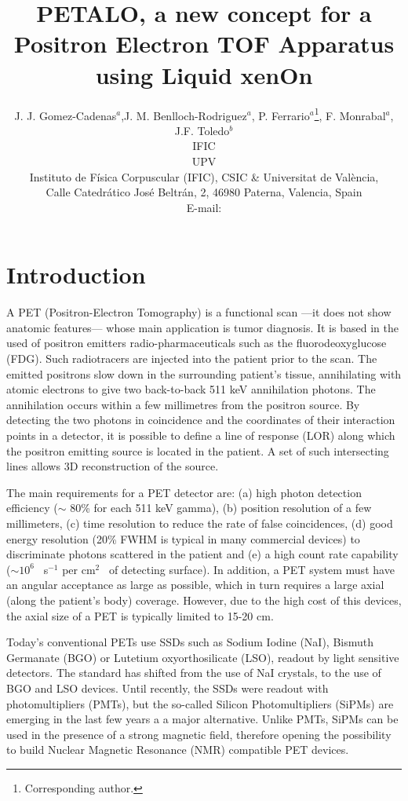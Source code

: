 \documentclass{JINST}
\title{PETALO, a new concept for a Positron Electron TOF Apparatus using Liquid xenOn}
\author{J. J. Gomez-Cadenas$^a$,J. M. Benlloch-Rodriguez$^a$, P. Ferrario$^a$\thanks{Corresponding author.}, 
F. Monrabal$^a$, J.F. Toledo$^b$

\llap{$^a$}IFIC\\
\llap{$^b$}UPV\\
\llap{$^b$}Instituto de F\'isica Corpuscular (IFIC), CSIC \& Universitat de Val\`encia,\\ 
Calle Catedr\'atico Jos\'e Beltr\'an, 2, 46980 Paterna, Valencia, Spain\\

E-mail: \email{gomez@mail.cern.ch}}
\begin{document}
\section{Introduction}

\label{sec.intro}

A PET (Positron-Electron Tomography) is a functional scan ---it does not show anatomic features--- whose main application is tumor diagnosis. It is based in the used of positron emitters radio-pharmaceuticals such as the fluorodeoxyglucose (FDG). Such radiotracers 
are injected into the patient prior to the scan. The emitted positrons slow down in the surrounding patient’s tissue, annihilating with atomic electrons to give two back-to-back 511 keV annihilation photons. The annihilation occurs within a few millimetres from the positron source. By detecting the two photons in coincidence and the coordinates of their interaction points in a detector, it is possible to define a line of response (LOR) along which the positron emitting source is located in the patient. A set of such intersecting lines allows 3D reconstruction of the source. 

The main requirements for a PET detector are: (a) high photon detection efficiency ($\sim$ 80\% for each 511 keV gamma), (b) position resolution of a few millimeters, (c) time resolution to reduce the rate of false coincidences, (d) good energy resolution (20\% FWHM is typical in many commercial devices) to discriminate photons scattered in the patient and (e) a high count rate capability ($\sim10^6$~ s$^{-1}$ per cm$^2$~ of detecting surface). In addition, a PET system must have an angular acceptance as large as possible, which in turn requires a large axial (along the patient's body) coverage. However, due to the high cost of this devices, the axial size  of a PET is typically limited to 15-20 cm. 

Today's conventional PETs use SSDs such as Sodium Iodine (NaI), Bismuth Germanate (BGO) or Lutetium oxyorthosilicate (LSO), readout by light sensitive detectors. The standard has shifted from the use of NaI crystals, to the use of BGO and LSO devices. Until recently, the SSDs were readout with photomultipliers (PMTs), but the so-called Silicon Photomultipliers (SiPMs) are emerging in the last few years a a major alternative. Unlike PMTs, SiPMs can be used in the presence of a strong magnetic field, therefore opening the possibility to build Nuclear Magnetic Resonance (NMR) compatible PET devices. 
\end{document}
